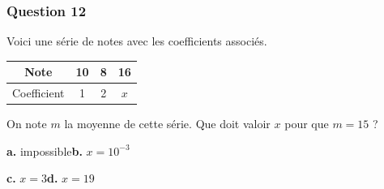 \subsubsection*{Question 12}
Voici une série de notes avec les coefficients associés.

\begin{center}
\begin{tabular}{|c|c|c|c|}
\hline
Note & 10 & 8 & 16 \\
\hline
Coefficient & 1 & 2 & $x$ \\
\hline
\end{tabular}
\end{center}

On note $m$ la moyenne de cette série. Que doit valoir $x$ pour que $m = 15$ ?

\textbf{a.} impossible\hfill \textbf{b.} $x = 10^{-3}$

\textbf{c.} $x = 3$\hfill \textbf{d.} $x = 19$
